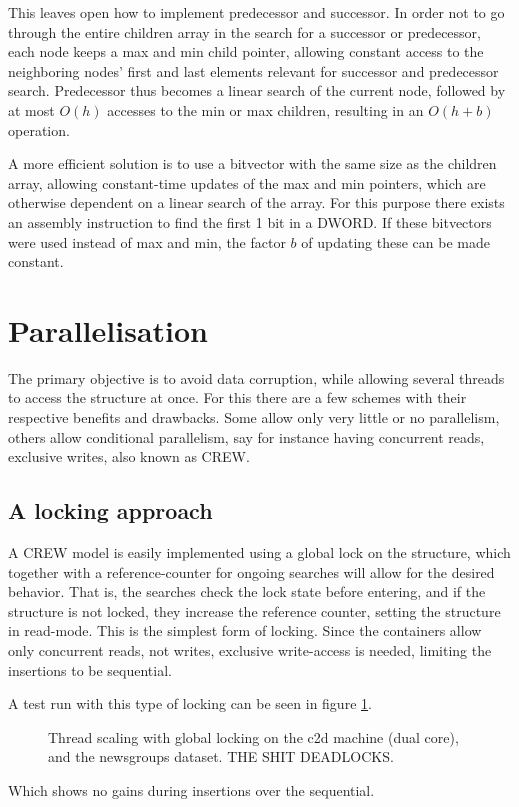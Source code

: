 This leaves open how to implement {\keyword predecessor} and {\keyword
successor}. In order not to go through the entire children array in the search
for a {\keyword successor} or {\keyword predecessor}, each node keeps a
{\keyword max} and {\keyword min} child pointer, allowing constant access to
the neighboring nodes' first and last elements relevant for successor and
predecessor search. Predecessor thus becomes a linear search of the current
node, followed by at most $O(h)$ accesses to the {\keyword min} or {\keyword
max} children, resulting in an $O(h+b)$ operation.

A more efficient solution is to use a bitvector with the same size as the
children array, allowing constant-time updates of the {\keyword max} and
{\keyword min} pointers, which are otherwise dependent on a linear search of
the array. For this purpose there exists an assembly instruction to find the
first 1 bit in a DWORD. If these bitvectors were used instead of {\keyword max}
and {\keyword min}, the factor $b$ of updating these can be made constant.


\clearpage
\section{Parallelisation}
The primary objective is to avoid data corruption, while allowing several
threads to access the structure at once. For this there are a few schemes with
their respective benefits and drawbacks. Some allow only very little or no
parallelism, others allow conditional parallelism, say for instance having
concurrent reads, exclusive writes, also known as CREW.

\subsection{A locking approach}
A CREW model is easily implemented using a global lock on the structure, which
together with a reference-counter for ongoing searches will allow for the
desired behavior. That is, the searches check the lock state before entering,
and if the structure is not locked, they increase the reference counter,
setting the structure in read-mode. This is the simplest form of locking.
Since the \STL containers allow only concurrent reads, not writes, exclusive
write-access is needed, limiting the insertions to be sequential.

A test run with this type of locking can be seen in figure \ref{fig:globallock}.
\begin{figure}[h!]
    \caption{Thread scaling with global locking on the c2d machine (dual core),
    and the newsgroups dataset. THE SHIT DEADLOCKS.}
    \label{fig:globallock}
\end{figure}
Which shows no gains during insertions over the sequential.


